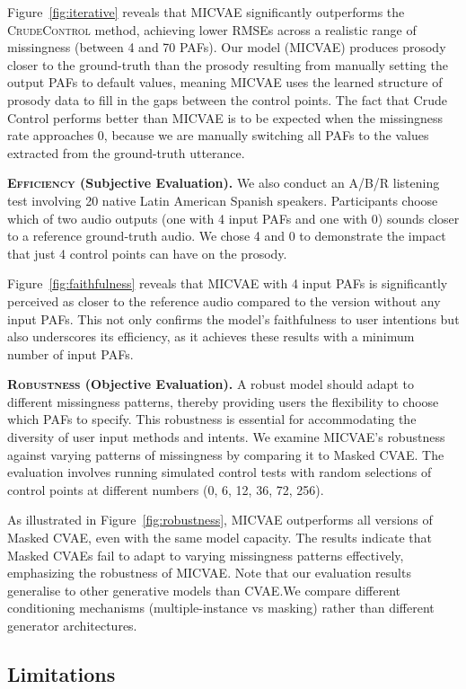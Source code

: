 \documentclass[a4paper,12pt,twoside,openright]{report}
\begin{document}
Figure~\ref{fig:iterative} reveals that MICVAE significantly outperforms the \textsc{CrudeControl} method, achieving lower RMSEs across a realistic range of missingness (between 4 and 70 PAFs). Our model (MICVAE) produces prosody closer to the ground-truth than the prosody resulting from manually setting the output PAFs to default values, meaning MICVAE uses the learned structure of prosody data to fill in the gaps between the control points. The fact that Crude Control performs better than MICVAE is to be expected when the missingness rate approaches 0, because we are manually switching all PAFs to the values extracted from the ground-truth utterance.

\textbf{\textsc{Efficiency} (Subjective Evaluation).} We also conduct an A/B/R listening test involving 20 native Latin American Spanish speakers. Participants choose which of two audio outputs (one with 4 input PAFs and one with 0) sounds closer to a reference ground-truth audio. We chose 4 and 0 to demonstrate the impact that just 4 control points can have on the prosody.

Figure~\ref{fig:faithfulness} reveals that MICVAE with 4 input PAFs is significantly perceived as closer to the reference audio compared to the version without any input PAFs. This not only confirms the model's faithfulness to user intentions but also underscores its efficiency, as it achieves these results with a minimum number of input PAFs.

\textbf{\textsc{Robustness} (Objective Evaluation).} A robust model should adapt to different missingness patterns, thereby providing users the flexibility to choose which PAFs to specify. This robustness is essential for accommodating the diversity of user input methods and intents. We examine MICVAE's robustness against varying patterns of missingness by comparing it to Masked CVAE. The evaluation involves running simulated control tests with random selections of control points at different numbers (0, 6, 12, 36, 72, 256).

As illustrated in Figure~\ref{fig:robustness}, MICVAE outperforms all versions of Masked CVAE, even with the same model capacity. The results indicate that Masked CVAEs fail to adapt to varying missingness patterns effectively, emphasizing the robustness of MICVAE. Note that our evaluation results generalise to other generative models than CVAE.\@ We compare different conditioning mechanisms (multiple-instance vs masking) rather than different generator architectures.

\subsection{Limitations}
\end{document}
